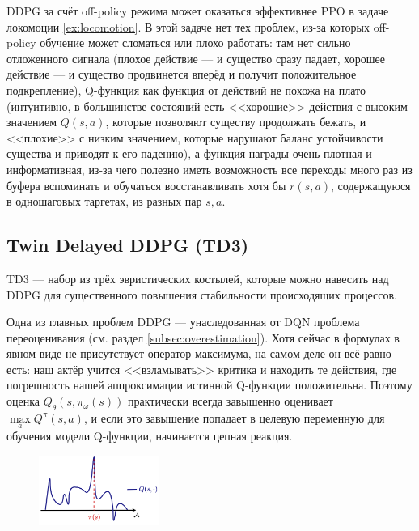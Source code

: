 \begin{remark}
DDPG за счёт off-policy режима может оказаться эффективнее PPO в задаче локомоции \ref{ex:locomotion}. В этой задаче нет тех проблем, из-за которых off-policy обучение может сломаться или плохо работать: там нет сильно отложенного сигнала (плохое действие --- и существо сразу падает, хорошее действие --- и существо продвинется вперёд и получит положительное подкрепление), Q-функция как функция от действий не похожа на плато (интуитивно, в большинстве состояний есть <<хорошие>> действия с высоким значением $Q(s, a)$, которые позволяют существу продолжать бежать, и <<плохие>> с низким значением, которые нарушают баланс устойчивости существа и приводят к его падению), а функция награды очень плотная и информативная, из-за чего полезно иметь возможность все переходы много раз из буфера вспоминать и обучаться восстанавливать хотя бы $r(s, a)$, содержащуюся в одношаговых таргетах, из разных пар $s, a$.
\end{remark}

\subsection{Twin Delayed DDPG (TD3)}\label{subsec:td3}

TD3 --- набор из трёх эвристических костылей, которые можно навесить над DDPG для существенного повышения стабильности происходящих процессов.

Одна из главных проблем DDPG --- унаследованная от DQN проблема переоценивания (см. раздел \ref{subsec:overestimation}). Хотя сейчас в формулах в явном виде не присутствует оператор максимума, на самом деле он всё равно есть: наш актёр учится <<взламывать>> критика и находить те действия, где погрешность нашей аппроксимации истинной Q-функции положительна. Поэтому оценка $Q_\theta (s, \pi_\omega(s))$ практически всегда завышенно оценивает $\max\limits_a Q^\pi(s, a)$, и если это завышение попадает в целевую переменную для обучения модели Q-функции, начинается цепная реакция. 

\begin{figure}
\centering
\includegraphics[width=0.35\textwidth]{Images/TD3_overestimation.png}
\end{figure}

